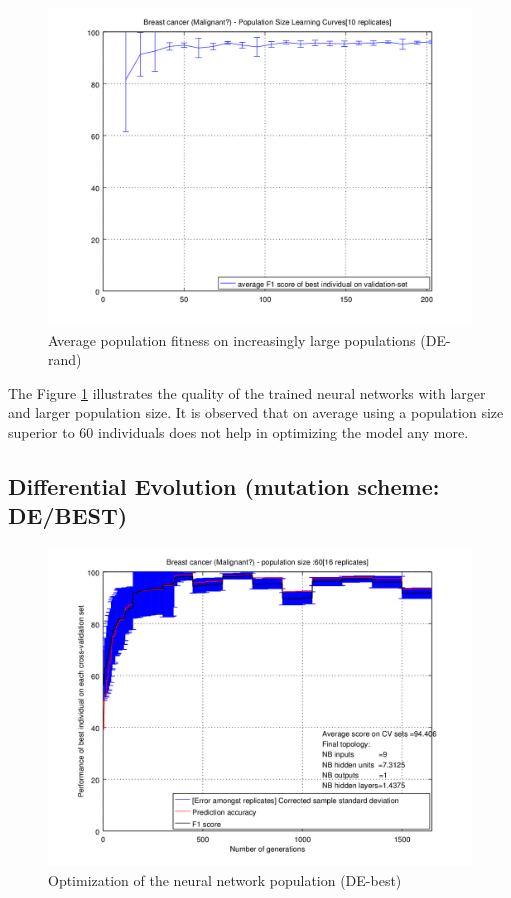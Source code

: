 \documentclass[a4paper,12pt, oneside]{memoir}
\begin{document}
\begin{figure}[h]
  \centering
  \includegraphics[scale=0.95]{malignant-learning_curve_pop_size-DE}
  \vspace{-12pt}
  \caption{Average population fitness on increasingly large populations (DE-rand)}
  \label{malignant-increasing-pop-size}
\end{figure}

The Figure \ref{malignant-increasing-pop-size} illustrates the quality of the trained neural networks with larger and larger population size. It is observed that on average using a population size superior to 60 individuals does not help in optimizing the model any more.

\clearpage

\subsection{Differential Evolution (mutation scheme: DE/BEST)}

\begin{figure}[h]
  \centering
  \includegraphics[scale=0.7]{malignant-performancesVSepochs-DE-BEST}
  \vspace{-12pt}
  \caption{Optimization of the neural network population (DE-best)}
  \label{malignant-perfs-DE-best}
\end{figure}
\end{document}
